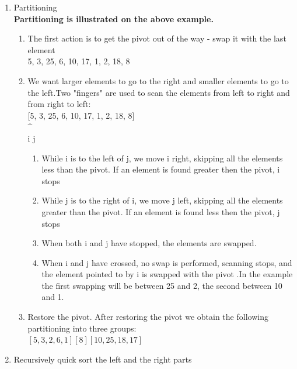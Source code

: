 \documentclass[a4paper,12pt]{article}
\begin{document}
{{\begin{enumerate}
\begin{enumerate}
				\textbf{Example:}\\
				8, 3, 25, 6, 10, 17, 1, 2, 18, 5 \\
				The first element is 8, the middle - 10, the last - 5. \\
				The median of [8, 10, 5] is 8
			\end{enumerate}
			
			\item Partitioning \\ \textbf{Partitioning is illustrated on the above example.}
			\begin{enumerate}
				\item The first action is to get the pivot out of the way - swap it with the last element \\
				5, 3, 25, 6, 10, 17, 1, 2, 18, 8\\
				\item  We want larger elements to go to the right and smaller elements to go to the left.Two "fingers" are used to scan the elements from left to right and from right to left:\\
				
				[5, 3, 25, 6, 10, 17, 1, 2, 18, 8]\\
				\^\qquad\qquad\qquad\qquad\qquad\qquad\^\\
				i \qquad\qquad\qquad\qquad\qquad\qquad j\\
				\begin{enumerate}
					\item  While i is to the left of j, we move i right, skipping all the elements less than the pivot. If an element is found greater then the pivot, i stops
					\item  While j is to the right of i, we move j left, skipping all the elements greater than the pivot. If an element is found less then the pivot, j stops
					\item  When both i and j have stopped, the elements are swapped.
					\item  When i and j have crossed, no swap is performed, scanning stops, and the element pointed to by i is swapped with the pivot .In the example the first swapping will be between 25 and 2, the second between 10 and 1.
				\end{enumerate}
				\item Restore the pivot.
				After restoring the pivot we obtain the following partitioning into three groups:\\
				$[5, 3, 2, 6, 1] [ 8 ] [10, 25, 18, 17]$		
			\end{enumerate}	
			\item Recursively quick sort the left and the right parts
		\end{enumerate} 


}}
\end{document}
